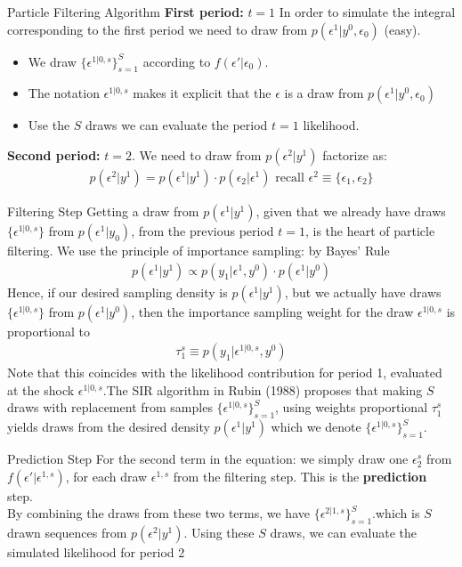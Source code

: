 \begin{frame}{Particle Filtering Algorithm}
\textbf{First period:} $t=1$ In order to simulate the integral corresponding to the first period we need to draw from $p(\epsilon^1 | y^0,\epsilon_0)$ (easy).  
\begin{itemize}
\item We draw $\{\epsilon^{1|0,s }\}_{s=1}^S$ according to $f(\epsilon' | \epsilon_0)$.
\item The notation $\epsilon^{1|0,s}$ makes it explicit that the $\epsilon$ is a draw from $p(\epsilon^1 | y^0,\epsilon_0)$
\item Use the $S$ draws we can evaluate the period $t=1$ likelihood.
\end{itemize}
\textbf{Second period:} $t=2$. We need to draw from $p(\epsilon^2 | y^1)$ factorize as:
\begin{eqnarray*}
p(\epsilon^2 | y^1) = p(\epsilon^1 | y^1) \cdot p(\epsilon_2 | \epsilon^1) \mbox{ recall } \epsilon^2 \equiv \{\epsilon_1,\epsilon_2\}
\end{eqnarray*}
\end{frame}

\begin{frame}{Filtering Step}
Getting a draw from $p(\epsilon^1| y^1)$, given that we already have draws $\{\epsilon^{1|0,s} \}$ from $p(\epsilon^1 | y_0)$, from the previous period $t = 1$, is the heart of particle filtering. We use the principle of importance sampling: by Bayes' Rule
\begin{eqnarray*}
p(\epsilon^1 | y^1) \propto p(y_1 | \epsilon^1, y^0) \cdot p (\epsilon^1 | y^0)
\end{eqnarray*}
Hence, if our desired sampling density is $p(\epsilon^1 | y^1)$, but we actually have draws $\{ \epsilon^{1|0,s}\}$ from $p(\epsilon^1| y^0)$, then the importance sampling weight for the draw
 $\epsilon^{1|0,s}$ is proportional to
\begin{eqnarray*}
\tau_1^s \equiv p(y_1 | \epsilon^{1|0,s},y^0)
\end{eqnarray*}
Note that this coincides with the likelihood contribution for period 1, evaluated at the shock $\epsilon^{1|0,s}$.The SIR algorithm in Rubin (1988) proposes that making $S$ draws with replacement from samples $\{ \epsilon^{1|0,s}\}_{s=1}^S$, using weights proportional $\tau_1^s$ yields draws from the desired density $p(\epsilon^1 | y^1)$ which we denote $\{ \epsilon^{1|0,s}\}_{s=1}^S$.
\end{frame}

\begin{frame}{Prediction Step}
For the second term in the equation: we simply draw one $\epsilon_2^s$ from $f(\epsilon' | \epsilon^{1,s})$, for each draw $\epsilon^{1,s}$ from the filtering step. This is the \textbf{prediction} step.\\
\vspace{0.25cm}
By combining the draws from these two terms, we have $\{ \epsilon^{2|1,s}\}_{s=1}^S$.which is $S$ drawn sequences from $p(\epsilon^2 | y^1)$. Using these $S$ draws, we can evaluate the simulated likelihood for period 2
\end{frame}

